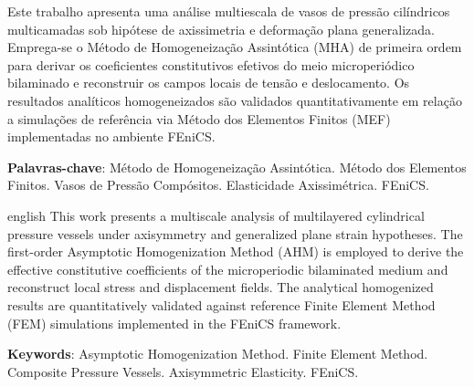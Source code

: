 \documentclass[
	12pt,				%
	openright,			%
	twoside,			%
	a4paper,			%
	english,			%
	brazilian			%
]{abntex2}
\begin{document}

\frenchspacing


\imprimircapa
\imprimirfolhaderosto

\setlength{\absparsep}{18pt}
\begin{resumo}
  Este trabalho apresenta uma análise multiescala de vasos de pressão cilíndricos multicamadas sob hipótese de axissimetria e deformação plana generalizada. Emprega-se o Método de Homogeneização Assintótica (MHA) de primeira ordem para derivar os coeficientes constitutivos efetivos do meio microperiódico bilaminado e reconstruir os campos locais de tensão e deslocamento. Os resultados analíticos homogeneizados são validados quantitativamente em relação a simulações de referência via Método dos Elementos Finitos (MEF) implementadas no ambiente FEniCS.

  \textbf{Palavras-chave}: Método de Homogeneização Assintótica. Método dos Elementos Finitos. Vasos de Pressão Compósitos. Elasticidade Axissimétrica. FEniCS.
\end{resumo}

\begin{resumo}[Abstract]
 \begin{otherlanguage*}{english}
   This work presents a multiscale analysis of multilayered cylindrical pressure vessels under axisymmetry and generalized plane strain hypotheses. The first-order Asymptotic Homogenization Method (AHM) is employed to derive the effective constitutive coefficients of the microperiodic bilaminated medium and reconstruct local stress and displacement fields. The analytical homogenized results are quantitatively validated against reference Finite Element Method (FEM) simulations implemented in the FEniCS framework.

   \textbf{Keywords}: Asymptotic Homogenization Method. Finite Element Method. Composite Pressure Vessels. Axisymmetric Elasticity. FEniCS.
 \end{otherlanguage*}
\end{resumo}

\listoffigures*
\cleardoublepage
\end{document}
